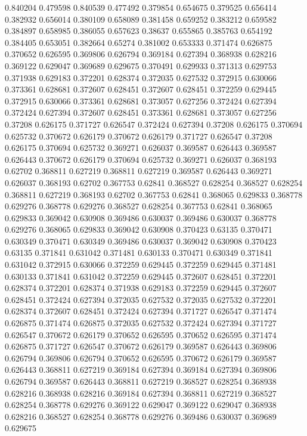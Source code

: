 0.840204 0.479598
0.840539 0.477492
0.379854 0.654675
0.379525 0.656414
0.382932 0.656014
0.380109 0.658089
0.381458 0.659252
0.383212 0.659582
0.384897 0.658985
0.386055 0.657623
0.38637 0.655865
0.385763 0.654192
0.384405 0.653051
0.382664 0.65274
0.381002 0.653333
0.371474 0.626875
0.370652 0.626595
0.369806 0.626794
0.369184 0.627394
0.368938 0.628216
0.369122 0.629047
0.369689 0.629675
0.370491 0.629933
0.371313 0.629753
0.371938 0.629183
0.372201 0.628374
0.372035 0.627532
0.372915 0.630066
0.373361 0.628681
0.372607 0.628451
0.372607 0.628451
0.372259 0.629445
0.372915 0.630066
0.373361 0.628681
0.373057 0.627256
0.372424 0.627394
0.372424 0.627394
0.372607 0.628451
0.373361 0.628681
0.373057 0.627256
0.37208 0.626175
0.371727 0.626547
0.372424 0.627394
0.37208 0.626175
0.370694 0.625732
0.370672 0.626179
0.370672 0.626179
0.371727 0.626547
0.37208 0.626175
0.370694 0.625732
0.369271 0.626037
0.369587 0.626443
0.369587 0.626443
0.370672 0.626179
0.370694 0.625732
0.369271 0.626037
0.368193 0.62702
0.368811 0.627219
0.368811 0.627219
0.369587 0.626443
0.369271 0.626037
0.368193 0.62702
0.367753 0.62841
0.368527 0.628254
0.368527 0.628254
0.368811 0.627219
0.368193 0.62702
0.367753 0.62841
0.368065 0.629833
0.368778 0.629276
0.368778 0.629276
0.368527 0.628254
0.367753 0.62841
0.368065 0.629833
0.369042 0.630908
0.369486 0.630037
0.369486 0.630037
0.368778 0.629276
0.368065 0.629833
0.369042 0.630908
0.370423 0.63135
0.370471 0.630349
0.370471 0.630349
0.369486 0.630037
0.369042 0.630908
0.370423 0.63135
0.371841 0.631042
0.371481 0.630133
0.370471 0.630349
0.371841 0.631042
0.372915 0.630066
0.372259 0.629445
0.372259 0.629445
0.371481 0.630133
0.371841 0.631042
0.372259 0.629445
0.372607 0.628451
0.372201 0.628374
0.372201 0.628374
0.371938 0.629183
0.372259 0.629445
0.372607 0.628451
0.372424 0.627394
0.372035 0.627532
0.372035 0.627532
0.372201 0.628374
0.372607 0.628451
0.372424 0.627394
0.371727 0.626547
0.371474 0.626875
0.371474 0.626875
0.372035 0.627532
0.372424 0.627394
0.371727 0.626547
0.370672 0.626179
0.370652 0.626595
0.370652 0.626595
0.371474 0.626875
0.371727 0.626547
0.370672 0.626179
0.369587 0.626443
0.369806 0.626794
0.369806 0.626794
0.370652 0.626595
0.370672 0.626179
0.369587 0.626443
0.368811 0.627219
0.369184 0.627394
0.369184 0.627394
0.369806 0.626794
0.369587 0.626443
0.368811 0.627219
0.368527 0.628254
0.368938 0.628216
0.368938 0.628216
0.369184 0.627394
0.368811 0.627219
0.368527 0.628254
0.368778 0.629276
0.369122 0.629047
0.369122 0.629047
0.368938 0.628216
0.368527 0.628254
0.368778 0.629276
0.369486 0.630037
0.369689 0.629675
